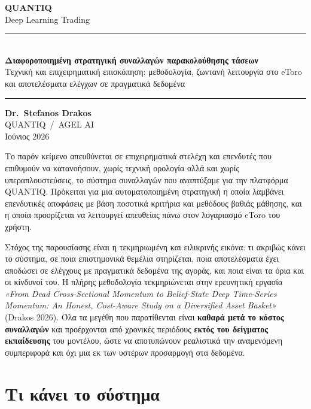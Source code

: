 \documentclass[11pt]{article}
\newcommand{\paperref}{\emph{«From Dead Cross-Sectional Momentum to Belief-State Deep Time-Series
Momentum: An Honest, Cost-Aware Study on a Diversified Asset Basket»} (Drakos 2026)}
\begin{document}
\begin{titlepage}\centering
\thispagestyle{empty}
\vspace*{3.2cm}
{\sffamily\bfseries\fontsize{52}{56}\selectfont QUANTIQ}\\[14pt]
{\sffamily\fontsize{22}{26}\selectfont\color{accent} Deep Learning Trading}\\[3.4cm]
\rule{0.66\linewidth}{0.4pt}\\[18pt]
{\large\bfseries Διαφοροποιημένη στρατηγική συναλλαγών παρακολούθησης τάσεων}\\[8pt]
{\normalsize Τεχνική και επιχειρηματική επισκόπηση: μεθοδολογία, ζωντανή λειτουργία στο eToro\\
και αποτελέσματα ελέγχων σε πραγματικά δεδομένα}\\[14pt]
\rule{0.66\linewidth}{0.4pt}
\vfill
{\large\bfseries Dr.\ Stefanos Drakos}\\[5pt]
{\normalsize QUANTIQ \,/\, AGEL AI}\\[3pt]
{\small Ιούνιος 2026}
\end{titlepage}

\noindent
Το παρόν κείμενο απευθύνεται σε επιχειρηματικά στελέχη και επενδυτές που επιθυμούν να κατανοήσουν, χωρίς
τεχνική ορολογία αλλά και χωρίς υπεραπλουστεύσεις, το σύστημα συναλλαγών που αναπτύξαμε για την πλατφόρμα
QUANTIQ. Πρόκειται για μια αυτοματοποιημένη στρατηγική η οποία λαμβάνει επενδυτικές αποφάσεις με βάση
ποσοτικά κριτήρια και μεθόδους βαθιάς μάθησης, και η οποία προορίζεται να λειτουργεί απευθείας πάνω στον
λογαριασμό eToro του χρήστη.

Στόχος της παρουσίασης είναι η τεκμηριωμένη και ειλικρινής εικόνα: τι ακριβώς κάνει το σύστημα, σε ποια
επιστημονικά θεμέλια στηρίζεται, ποια αποτελέσματα έχει αποδώσει σε ελέγχους με πραγματικά δεδομένα της
αγοράς, και ποια είναι τα όρια και οι κίνδυνοί του. Η πλήρης μεθοδολογία τεκμηριώνεται στην ερευνητική
εργασία \paperref. Όλα τα μεγέθη που παρατίθενται είναι \textbf{καθαρά μετά το κόστος συναλλαγών} και
προέρχονται από χρονικές περιόδους \textbf{εκτός του δείγματος εκπαίδευσης} του μοντέλου, ώστε να
αποτυπώνουν ρεαλιστικά την αναμενόμενη συμπεριφορά και όχι μια εκ των υστέρων προσαρμογή στα δεδομένα.

\section{Τι κάνει το σύστημα}
\end{document}
